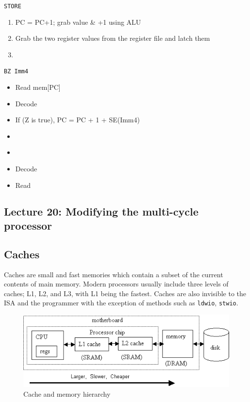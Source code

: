 \documentclass[../notes.tex]{subfiles}
\begin{document}
\texttt{STORE}


\begin{enumerate}
	\item PC = PC+1; grab value \& +1 using ALU
	\item Grab the two register values from the register file and latch them
	\item 
\end{enumerate}

\texttt{BZ Imm4} 
\begin{itemize}
	\item Read mem[PC]
	\item Decode
	\item If (Z is true), PC = PC + 1 + SE(Imm4) 
	\item 
\end{itemize}


\begin{itemize}
	\item 
\end{itemize}



\begin{itemize}
	\item Decode
	\item Read
\end{itemize}





\subsection{Lecture 20: Modifying the multi-cycle processor}



\subsection{Caches}


Caches are small and fast memories which contain a subset of the current contents of main memory.
Modern processors usually include three levels of caches; L1, L2, and L3, with L1 being the fastest.
Caches are also invisible to the ISA and the programmer with the exception of methods such as \texttt{ldwio}, \texttt{stwio}.

\begin{figure}[H]
	\centering
	\includegraphics[width=0.8\linewidth]{img/image_2022-11-24-13-17-16.png}
	\caption{Cache and memory hierarchy}
\end{figure}
\end{document}

